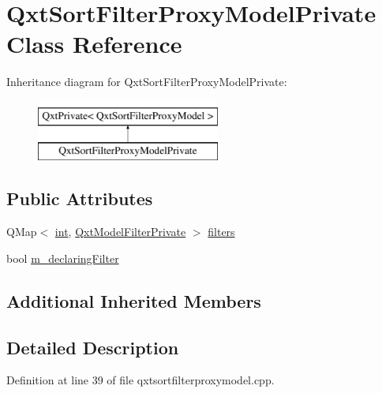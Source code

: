 \hypertarget{class_qxt_sort_filter_proxy_model_private}{\section{Qxt\-Sort\-Filter\-Proxy\-Model\-Private Class Reference}
\label{class_qxt_sort_filter_proxy_model_private}
}
Inheritance diagram for Qxt\-Sort\-Filter\-Proxy\-Model\-Private\-:\begin{figure}[H]
\begin{center}
\leavevmode
\includegraphics[height=2.000000cm]{class_qxt_sort_filter_proxy_model_private}
\end{center}
\end{figure}
\subsection*{Public Attributes}
\begin{DoxyCompactItemize}
\item 
Q\-Map$<$ \hyperlink{ioapi_8h_a787fa3cf048117ba7123753c1e74fcd6}{int}, \hyperlink{class_qxt_model_filter_private}{Qxt\-Model\-Filter\-Private} $>$ \hyperlink{class_qxt_sort_filter_proxy_model_private_ab0c67676026ff5fbd46522d09a73cda9}{filters}
\item 
bool \hyperlink{class_qxt_sort_filter_proxy_model_private_a674517e465342248fdc74ecc6eb8402e}{m\-\_\-declaring\-Filter}
\end{DoxyCompactItemize}
\subsection*{Additional Inherited Members}


\subsection{Detailed Description}


Definition at line 39 of file qxtsortfilterproxymodel.\-cpp.



